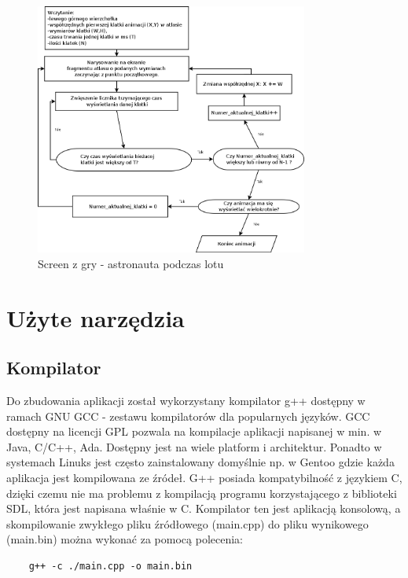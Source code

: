 \begin{figure}[h]
    \centering
    \includegraphics[width=0.8\textwidth,natwidth=510,natheight=142]{./Pictures/sprite_algorytm.png}
    \caption{Screen z gry - astronauta podczas lotu}
\end{figure}

\section{Użyte narzędzia}
\subsection{Kompilator}
\hspace{1cm} Do zbudowania aplikacji został wykorzystany kompilator g++ dostępny w ramach GNU GCC - zestawu kompilatorów dla popularnych języków. GCC dostępny na licencji GPL pozwala na kompilacje aplikacji napisanej w min. w Java, C/C++, Ada. Dostępny jest na wiele platform i architektur. Ponadto w systemach Linuks jest często zainstalowany domyślnie np. w Gentoo gdzie każda aplikacja jest kompilowana ze źródeł. G++ posiada kompatybilność z językiem C, dzięki czemu nie ma problemu z kompilacją programu korzystającego z biblioteki SDL, która jest napisana właśnie w C. Kompilator ten jest aplikacją konsolową, a skompilowanie zwykłego pliku źródłowego (main.cpp) do pliku wynikowego (main.bin) można wykonać za pomocą polecenia:
\begin{verbatim}
	g++ -c ./main.cpp -o main.bin
\end{verbatim}

